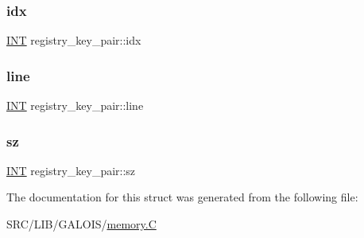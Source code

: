 \subsubsection{\texorpdfstring{idx}{idx}}
{\footnotesize\ttfamily \mbox{\hyperlink{galois_8h_a09fddde158a3a20bd2dcadb609de11dc}{I\+NT}} registry\+\_\+key\+\_\+pair\+::idx}

\mbox{\label{structregistry__key__pair_ad98d25e4748e98dd357d85c646d3f11c}} 
\subsubsection{\texorpdfstring{line}{line}}
{\footnotesize\ttfamily \mbox{\hyperlink{galois_8h_a09fddde158a3a20bd2dcadb609de11dc}{I\+NT}} registry\+\_\+key\+\_\+pair\+::line}

\mbox{\label{structregistry__key__pair_a0a6af774d4bb1546462d33d24ee99433}} 
\subsubsection{\texorpdfstring{sz}{sz}}
{\footnotesize\ttfamily \mbox{\hyperlink{galois_8h_a09fddde158a3a20bd2dcadb609de11dc}{I\+NT}} registry\+\_\+key\+\_\+pair\+::sz}



The documentation for this struct was generated from the following file\+:\begin{DoxyCompactItemize}
\item 
S\+R\+C/\+L\+I\+B/\+G\+A\+L\+O\+I\+S/\mbox{\hyperlink{_g_a_l_o_i_s_2memory_8_c}{memory.\+C}}\end{DoxyCompactItemize}
